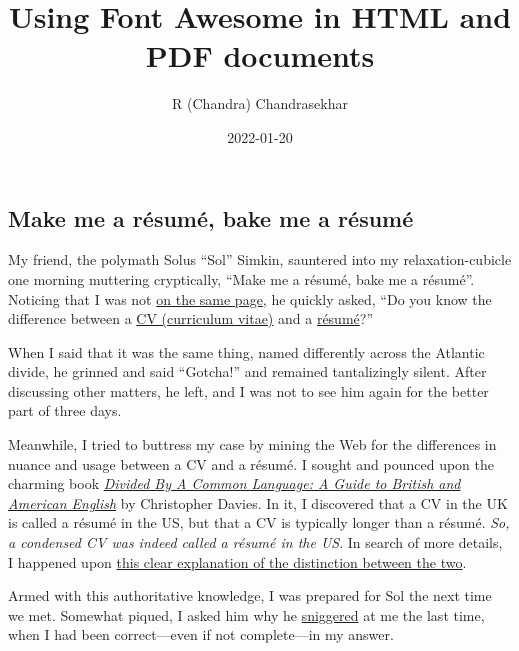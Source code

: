 \documentclass[
  british,
  a4paper,
  rgb,
  dvipsnames,
  svgnames,
  hyphens]{article}
\title{Using Font Awesome in HTML and PDF documents}
\author{R (Chandra) Chandrasekhar}
\date{2022-01-20}
\begin{document}
\maketitle

\setlength{\parindent}{0pt} %
\thispagestyle{empty}


\hypertarget{make-me-a-ruxe9sumuxe9-bake-me-a-ruxe9sumuxe9}{%
\subsection{Make me a résumé, bake me a
résumé}\label{make-me-a-ruxe9sumuxe9-bake-me-a-ruxe9sumuxe9}}

My friend, the polymath Solus ``Sol'' Simkin, sauntered into my
relaxation-cubicle one morning muttering cryptically, ``Make me a
résumé, bake me a résumé''. Noticing that I was not
\href{https://www.macmillandictionary.com/dictionary/british/be-on-the-same-page}{on
the same page}, he quickly asked, ``Do you know the difference between a
\href{https://www.thefreedictionary.com/curriculum+vitae}{CV (curriculum
vitae)} and a
\href{https://www.collinsdictionary.com/dictionary/english/résumé}{résumé}?''

When I said that it was the same thing, named differently across the
Atlantic divide, he grinned and said ``Gotcha!'' and remained
tantalizingly silent. After discussing other matters, he left, and I was
not to see him again for the better part of three days.

Meanwhile, I tried to buttress my case by mining the Web for the
differences in nuance and usage between a CV and a résumé. I sought and
pounced upon the charming book
\href{https://www.amazon.in/Divided-Common-Language-Christopher-Davies/dp/0618911626/}{\emph{Divided
By A Common Language: A Guide to British and American English}} by
Christopher Davies. In it, I discovered that a CV in the UK is called a
résumé in the US, but that a CV is typically longer than a résumé.
\emph{So, a condensed CV was indeed called a résumé in the US}. In
search of more details, I happened upon
\href{https://icc.ucdavis.edu/materials/résumé/résumécv}{this clear
explanation of the distinction between the two}.

Armed with this authoritative knowledge, I was prepared for Sol the next
time we met. Somewhat piqued, I asked him why he
\href{https://www.collinsdictionary.com/dictionary/english/snigger}{sniggered}
at me the last time, when I had been correct---even if not complete---in
my answer.
\end{document}
